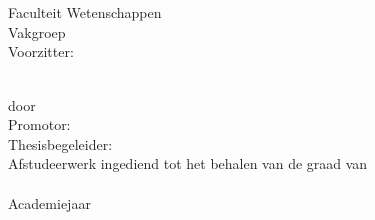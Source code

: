 \begin{titlepage}
\renewcommand{\baselinestretch}{1.1}
\Large
\begin{center}
\mbox{}\\[0cm]%
\unitlength 1mm

\epsfysize 4cm \epsfclipon{}\\
{\Large  
Faculteit Wetenschappen\\
Vakgroep \vakgroep\\
Voorzitter: \voorzitter
}\\\vfill
\parbox{14 cm}{
{\huge\bfseries
\begin{center}
\sf\titel
\end{center}
}
}\\\vfill
door \auteur\\[3.3cm]
Promotor: \promotor \\
Thesisbegeleider: \begeleider 
\\\vfill
Afstudeerwerk ingediend tot het behalen van de graad van\\
\richting\\[1cm]
Academiejaar \jaar
\end{center}
\renewcommand{\baselinestretch}{1}
\end{titlepage}





